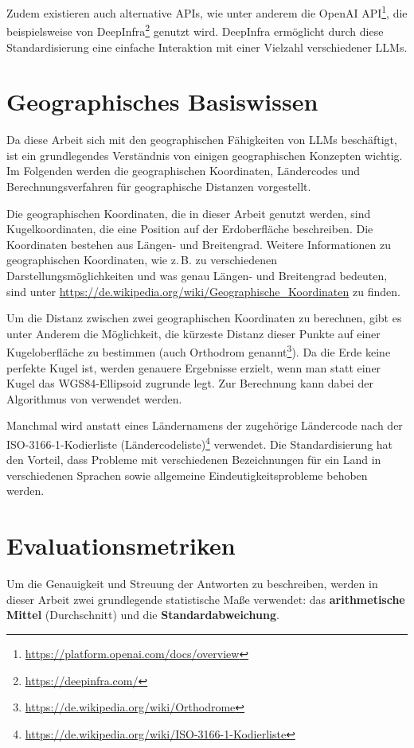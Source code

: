 Zudem existieren auch alternative APIs, wie unter anderem die OpenAI API\footnote{\url{https://platform.openai.com/docs/overview}}, die beispielsweise von DeepInfra\footnote{\url{https://deepinfra.com/}} genutzt wird.
DeepInfra ermöglicht durch diese Standardisierung eine einfache Interaktion mit einer Vielzahl verschiedener LLMs.



\section*{Geographisches Basiswissen}
Da diese Arbeit sich mit den geographischen Fähigkeiten von LLMs beschäftigt, ist ein grundlegendes Verständnis von einigen geographischen Konzepten wichtig.
Im Folgenden werden die geographischen Koordinaten, Ländercodes und Berechnungsverfahren für geographische Distanzen vorgestellt.

Die geographischen Koordinaten, die in dieser Arbeit genutzt werden, sind Kugelkoordinaten, die eine Position auf der Erdoberfläche beschreiben.
Die Koordinaten bestehen aus Längen- und Breitengrad.
Weitere Informationen zu geographischen Koordinaten, wie z.\,B. zu verschiedenen Darstellungsmöglichkeiten und was genau Längen- und Breitengrad bedeuten, sind unter \url{https://de.wikipedia.org/wiki/Geographische_Koordinaten} zu finden.

Um die Distanz zwischen zwei geographischen Koordinaten zu berechnen, gibt es unter Anderem die Möglichkeit, die kürzeste Distanz dieser Punkte auf einer Kugeloberfläche zu bestimmen (auch Orthodrom genannt\footnote{\url{https://de.wikipedia.org/wiki/Orthodrome}}).
Da die Erde keine perfekte Kugel ist, werden genauere Ergebnisse erzielt, wenn man statt einer Kugel das WGS84-Ellipsoid zugrunde legt.
Zur Berechnung kann dabei der Algorithmus von \citet{karneyAlgorithmsGeodesics2013} verwendet werden.

Manchmal wird anstatt eines Ländernamens der zugehörige Ländercode nach der ISO-3166-1-Kodierliste (Ländercodeliste)\footnote{\url{https://de.wikipedia.org/wiki/ISO-3166-1-Kodierliste}} verwendet.
Die Standardisierung hat den Vorteil, dass Probleme mit verschiedenen Bezeichnungen für ein Land in verschiedenen Sprachen sowie allgemeine Eindeutigkeitsprobleme behoben werden.



\section*{Evaluationsmetriken}
Um die Genauigkeit und Streuung der Antworten zu beschreiben, werden in dieser Arbeit zwei grundlegende statistische Maße verwendet: das \textbf{arithmetische Mittel} (Durchschnitt) und die \textbf{Standardabweichung}.

